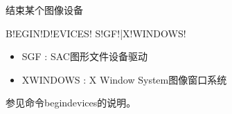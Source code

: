 \label{cmd:enddevices}

结束某个图像设备

\begin{SACSTX}
B!EGIN!D!EVICES! S!GF!|X!WINDOWS!
\end{SACSTX}

\begin{itemize}
\item SGF : SAC图形文件设备驱动
\item XWINDOWS : X Window System图像窗口系统
\end{itemize}

参见命令begindevices的说明。

